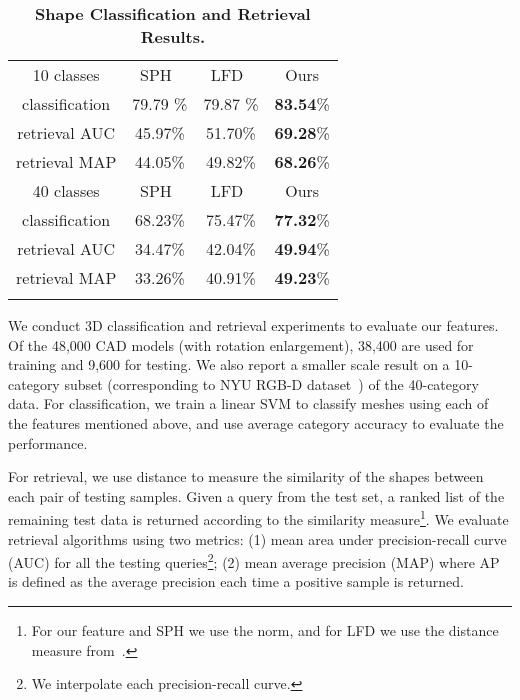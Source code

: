 \documentclass[10pt,twocolumn,letterpaper]{article}
\begin{document}
\begin{table}[t]
\centering
\begin{tabular}{c|c|c|c}

\Xhline{2\arrayrulewidth}
10 classes & SPH~\cite{SHPfeature} & LFD~\cite{LFDfeature} & Ours\tabularnewline
\Xhline{2\arrayrulewidth}
classification & 79.79 \% & 79.87 \% & {\bf 83.54}\%
\tabularnewline
retrieval AUC & 45.97\% & 51.70\% & {\bf 69.28}\%
\tabularnewline
retrieval MAP & 44.05\% & 49.82\% & {\bf 68.26}\%
\tabularnewline

\Xhline{2\arrayrulewidth}
40 classes & SPH~\cite{SHPfeature} & LFD~\cite{LFDfeature} & Ours\tabularnewline
\Xhline{2\arrayrulewidth}
classification & 68.23\% & 75.47\% & {\bf 77.32}\%
\tabularnewline
retrieval AUC & 34.47\% & 42.04\% & {\bf 49.94}\%
\tabularnewline
retrieval MAP & 33.26\% & 40.91\% & {\bf 49.23}\%
\tabularnewline

\Xhline{2\arrayrulewidth}
\end{tabular}

\vspace{-2mm}
\caption{{\bf Shape Classification and Retrieval Results.} }
\vspace{-2mm}
\label{table:cls}
\end{table}




We conduct 3D classification and retrieval experiments to evaluate our features. Of the 48,000 CAD models (with rotation enlargement), 38,400 are used for training and 9,600 for testing. We also report a smaller scale result on a 10-category subset (corresponding to NYU RGB-D dataset~\cite{NYUdataset}) of the 40-category data. For classification, we train a linear SVM to classify meshes using each of the features mentioned above, and use average category accuracy to evaluate the performance. 



For retrieval, we use  distance to measure the similarity of the shapes between each pair of testing samples. Given a query from the test set, a ranked list of the remaining test data is returned according to the similarity measure\footnote{For our feature and SPH we use the  norm, and for LFD we use the distance measure from~\cite{LFDfeature}.}. We evaluate retrieval algorithms using two metrics: (1) mean area under precision-recall curve (AUC) for all the testing queries\footnote{We interpolate each precision-recall curve.}; (2) mean average precision (MAP) where AP is defined as the average precision each time a positive sample is returned. 
\end{document}
